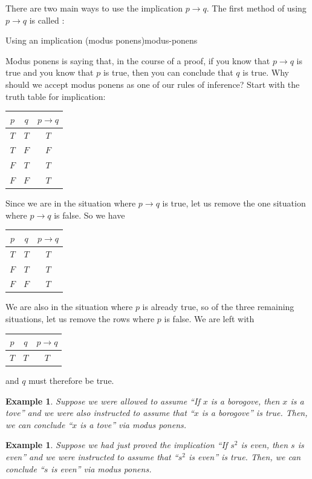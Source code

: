 \documentclass{book}
\newcounter{ekcounter}%
\theoremstyle{ekimcustom}
\newtheorem{example}[ekcounter]{Example}
\newcommand\defn[1]{{\color{blue}{\bf #1}}}
\begin{document}
There are two main ways to use the implication $p \rightarrow q$. The first method of using $p \rightarrow q$ is called \defn{modus ponens}:
\begin{bmethod}{Using an implication (modus ponens)}{modus-ponens}
\begin{center}
\end{center}
\end{bmethod}
Modus ponens is saying that, in the course of a proof, if you know that $p \rightarrow q$ is true and you know that $p$ is true, then you can conclude that $q$ is true. Why should we accept modus ponens as one of our rules of inference? Start with the truth table for implication:
\begin{center}
\begin{tabular}{c|c||c}
$p$ & $q$ & $p \rightarrow q$ \\\hline
$T$ & $T$ & $T$\\
$T$ & $F$ & $F$\\
$F$ & $T$ & $T$\\
$F$ & $F$ & $T$
\end{tabular}
\end{center}
Since we are in the situation where $p \rightarrow q$ is true, let us remove the one situation where $p \rightarrow q$ is false. So we have
\begin{center}
\begin{tabular}{c|c||c}
$p$ & $q$ & $p \rightarrow q$ \\\hline
$T$ & $T$ & $T$\\
$F$ & $T$ & $T$\\
$F$ & $F$ & $T$
\end{tabular}
\end{center}
We are also in the situation where $p$ is already true, so of the three remaining situations, let us remove the rows where $p$ is false. We are left with
\begin{center}
\begin{tabular}{c|c||c}
$p$ & $q$ & $p \rightarrow q$ \\\hline
$T$ & $T$ & $T$\\
\end{tabular}
\end{center}
and $q$ must therefore be true.
\begin{example}
Suppose we were allowed to assume ``If $x$ is a borogove, then $x$ is a tove'' and we were also instructed to assume that ``$x$ is a borogove'' is true. Then, we can conclude ``$x$ is a tove'' via modus ponens.
\end{example}
\begin{example}
Suppose we had just proved the implication ``If $s^2$ is even, then $s$ is even'' and we were instructed to assume that ``$s^2$ is even'' is true. Then, we can conclude ``$s$ is even'' via modus ponens.
\end{example}
\end{document}
